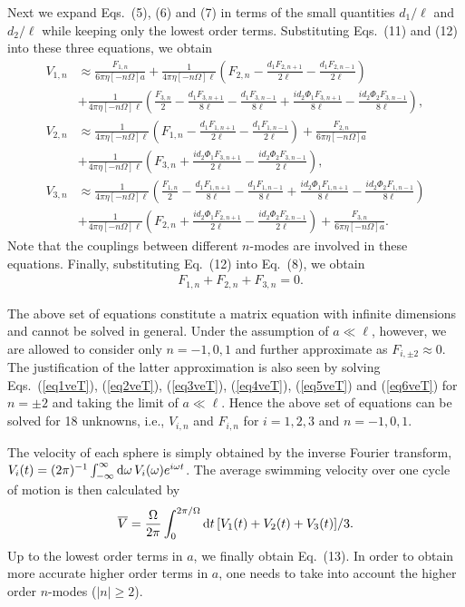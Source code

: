 \documentclass[nofootinbib,twocolumn,showpacs,preprintnumbers,pre,aps]{revtex4-1}
\begin{document}
Next we expand Eqs.~(5), (6) and (7) in terms of the small quantities 
$d_1/\ell$ and $d_2/\ell$ while keeping only the lowest order terms. 
Substituting Eqs.~(11) and (12) into these three equations, we obtain
\begin{align}
V_{1,n}& \approx \frac{F_{1,n}}{6\pi\eta[-n\Omega] a}+\frac{1}{4\pi\eta[-n\Omega]\ell}\left(F_{2,n}-\frac{d_1F_{2,n+1}}{2\ell}-\frac{d_1F_{2,n-1}}{2\ell}\right)\nonumber\\
&+\frac{1}{4\pi\eta[-n\Omega]\ell}\left(\frac{F_{3,n}}{2}-\frac{d_1F_{3,n+1}}{8\ell}-\frac{d_1F_{3,n-1}}{8\ell}+\frac{id_2\Phi_1F_{3,n+1}}{8\ell}-\frac{id_2\Phi_2F_{3,n-1}}{8\ell}\right),
\label{eq3veT}\\
V_{2,n}& \approx \frac{1}{4\pi\eta[-n\Omega]\ell}\left(F_{1,n}-\frac{d_1F_{1,n+1}}{2\ell}-\frac{d_1F_{1,n-1}}{2\ell}\right)+\frac{F_{2,n}}{6\pi\eta[-n\Omega] a}\nonumber\\
&+\frac{1}{4\pi\eta[-n\Omega] \ell}\left(F_{3,n}+\frac{id_2\Phi_1F_{3,n+1}}{2\ell}-\frac{id_2\Phi_2F_{3,n-1}}{2\ell}\right),
\label{eq4veT}\\
V_{3,n}& \approx \frac{1}{4\pi\eta[-n\Omega]\ell }\left(\frac{F_{1,n}}{2}-\frac{d_1F_{1,n+1}}{8\ell}-\frac{d_1F_{1,n-1}}{8\ell}+\frac{id_2\Phi_1F_{1,n+1}}{8\ell}-\frac{id_2\Phi_2F_{1,n-1}}{8\ell}\right)\nonumber\\
&+\frac{1}{4\pi\eta[-n\Omega]\ell }\left(F_{2,n}+\frac{id_2\Phi_1F_{2,n+1}}{2\ell}-\frac{id_2\Phi_2F_{2,n-1}}{2\ell}\right)+\frac{F_{3,n}}{6\pi\eta[-n\Omega] a}.
\label{eq5veT}
\end{align}
Note that the couplings between different $n$-modes are involved in these equations.
Finally, substituting Eq.~(12) into Eq.~(8), we obtain
\begin{align}
\label{eq6veT}
&F_{1,n}+F_{2,n}+F_{3,n}=0.
\end{align}


The above set of equations constitute a matrix equation with infinite dimensions 
and cannot be solved in general.  
Under the assumption of $a\ll\ell$, however, we are allowed to consider only
$n=-1, 0, 1$ and further approximate as $F_{i,\pm2}\approx 0$. 
The justification of the latter approximation is also seen by solving 
Eqs.~(\ref{eq1veT}), (\ref{eq2veT}), (\ref{eq3veT}), (\ref{eq4veT}), 
(\ref{eq5veT}) and (\ref{eq6veT}) for $n=\pm2$ and taking the limit of $a\ll\ell$.
Hence the above set of equations can be solved for 18 unknowns, i.e., 
$V_{i,n}$ and $F_{i,n}$ for $i=1, 2, 3$ and $n=-1, 0, 1$.


The velocity of each sphere is simply obtained by the inverse Fourier transform,
$V_i(t)=(2\pi)^{-1} \int_{-\infty}^{\infty} {\rm d} \omega\, V_i(\omega) e^{i\omega t}$.
The average swimming velocity over one cycle of motion is then calculated by 
\begin{equation}
\label{barV}
\overline{V}=\frac{\Omega}{2\pi}\int_0^{2\pi/\Omega}{\rm d}t\, 
[V_1(t)+V_2(t)+V_3(t)]/3.
\end{equation}
Up to the lowest order terms in $a$, we finally obtain Eq.~(13).
In order to obtain more accurate higher order terms in $a$, one needs to 
take into account the higher order $n$-modes ($|n| \ge 2$).
\end{document}
